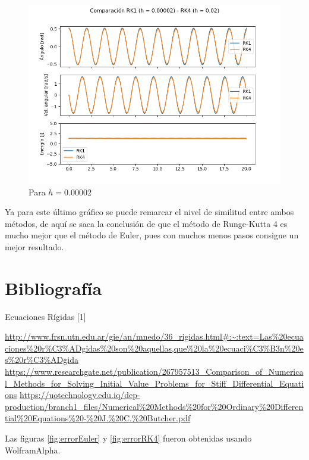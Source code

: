 \documentclass[titlepage,a4paper]{article}
\begin{document}
    \begin{figure}[!htb]
        \centering
        \includegraphics[scale = 0.6]{ambosjuntos 0,00002.png}
        \caption{Para $h = 0.00002$}
        \label{fig:errorH4}
    \end{figure}

    Ya para este último gráfico se puede remarcar el nivel de similitud entre ambos métodos, de aquí se saca la conclusión de que el método de Runge-Kutta 4 es mucho mejor que el método de Euler, pues con muchos menos pasos consigue un mejor resultado.

\section{Bibliografía}\label{sec:bibliografia}

    Ecuaciones Rígidas [1]
    
    \bigskip
    \url{http://www.frsn.utn.edu.ar/gie/an/mnedo/36\_rigidas.html#:~:text=Las\%20ecuaciones\%20r\%C3\%ADgidas\%20son\%20aquellas,que\%20la\%20ecuaci\%C3\%B3n\%20es\%20r\%C3\%ADgida}
    \bigskip
    \url{https://www.researchgate.net/publication/267957513_Comparison_of_Numerical_Methods_for_Solving_Initial_Value_Problems_for_Stiff_Differential_Equations}
    \bigskip
    \url{https://uotechnology.edu.iq/dep-production/branch1_files/Numerical\%20Methods\%20for\%20Ordinary\%20Differential\%20Equations\%20-\%20J.\%20C.\%20Butcher.pdf}

    \bigskip

    Las figuras \ref{fig:errorEuler} y \ref{fig:errorRK4} fueron obtenidas usando WolframAlpha.
    

    
\end{document}
